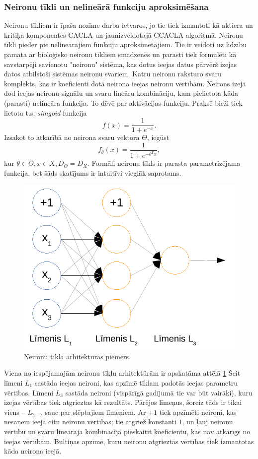 \documentclass{ludis} %
\begin{document}
\subsubsection{Neironu tīkli un nelineārā funkciju aproksimēšana}
Neironu tīkliem ir īpaša nozīme darba ietvaros, jo tie tiek izmantoti kā aktiera
un kritiķa komponentes CACLA un jaunizveidotajā CCACLA algoritmā.
Neironu tīkli pieder pie nelineārajiem funkciju aproksimētājiem. Tie ir veidoti
uz līdzību pamata ar bioloģisko neironu tīkliem smadzenēs un parasti tiek
formulēti kā savstarpēji savienotu "neironu" sistēma, kas dotus ieejas datus
pārvērš izejas datos atbilstoši sistēmas neironu svariem. Katru neironu raksturo
svaru komplekts, kas ir koeficienti dotā neirona ieejas neironu vērtībām.
Neirons izejā dod ieejas neironu signālu un svaru lineāru kombināciju, kam
pielietota kāda (parasti) nelineāra funkcija. To dēvē par aktivācijas funkciju.
Praksē bieži tiek lietota t.s. \textit{simgoid} funkcija
\[
	f(x) = \frac{1}{1 + e^{-x}}.
\]
Izsakot to atkarībā no neirona svaru vektora $\Theta$, iegūst
\[
	f_\theta(x) = \frac{1}{1 + e^{-\theta^T x}},
\]
kur $\theta \in \Theta, x \in X, D_\Theta = D_X$. Formāli neironu tīkls ir
parasta parametrizējama funkcija, bet šāds skatījums ir intuitīvi vieglāk
saprotams.

\begin{figure}
	\centering
	\includegraphics{Img/nn-arhitektura.pdf}
	\caption{Neironu tīkla arhitektūras piemērs.}
	\label{fig:nn}
\end{figure}

Viena no iespējamajām neironu tīklu arhitektūrām ir apskatāma attēlā
\ref{fig:nn} Šeit līmeni $L_1$ sastāda ieejas neironi, kas apzīmē tīklam padotās
ieejas parametru vērtības. Līmeni $L_3$ sastāda neironi (vispārīgā gadījumā tie
var būt vairāki), kuru izejas vērtības tiek atgrieztas kā rezultāts. Pārējos
līmeņus, šoreiz tāds ir tikai viens -- $L_2$ --, sauc par slēptajiem līmeņiem.
Ar $+1$ tiek apzīmēti neironi, kas nesaņem ieejā citu neironu vērtības; tie
atgriež konstanti $1$, un ļauj neironu vērtību un svaru lineārajā kombinācijā
pieskaitīt koeficientu, kas nav atkarīgs no ieejas vērtībām. Bultiņas apzīmē,
kuru neironu atgrieztās vērtības tiek izmantotas kāda neirona ieejā.
\end{document}
